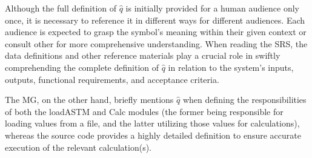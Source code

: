  Although the full definition of $\hat{q}$ is initially provided 
for a human audience only once, it is necessary to reference it in different 
ways for different audiences. Each audience is expected to grasp the symbol's 
meaning within their given context or consult other \sfs{} for more 
comprehensive understanding. When reading the SRS, the data definitions and 
other reference materials play a crucial role in swiftly comprehending the 
complete definition of $\hat{q}$ in relation to the system's inputs, outputs, 
functional requirements, and acceptance criteria.

The MG, on the other hand, briefly mentions $\hat{q}$ when defining the 
responsibilities of both the loadASTM and Calc modules (the former being 
responsible for loading values from a file, and the latter utilizing those 
values for calculations), whereas the source code provides a highly detailed 
definition to ensure accurate execution of the relevant calculation(s).

